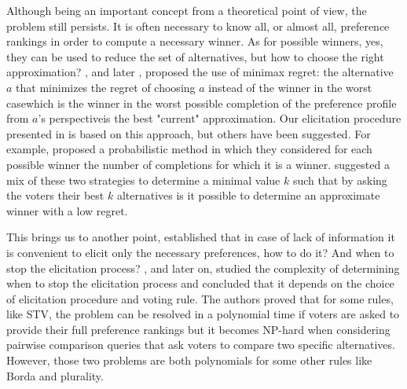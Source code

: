 Although being an important concept from a theoretical point of view, the problem still persists. It is often necessary to know all, or almost all, preference rankings in order to compute a necessary winner. As for possible winners, yes, they can be used to reduce the set of alternatives, but how to choose the right approximation?
\citet{Boutilier2006}, and later \citet{Lu2011}, proposed the use of minimax regret: the alternative $a$ that minimizes the regret of choosing $a$ instead of the winner in the worst case\textemdash which is the winner in the worst possible completion of the preference profile from $a$'s perspective\textemdash is the best "current" approximation.
Our elicitation procedure presented in  is based on this approach, but others have been suggested.
For example, \citet{Bachrach2010} proposed a probabilistic method in which they considered for each possible winner the number of completions for which it is a winner.
\citet{Lu2011Prob} suggested a mix of these two strategies to determine a minimal value $k$ such that by asking the voters their best $k$ alternatives is it possible to determine an approximate winner with a low regret.

This brings us to another point, established that in case of lack of information it is convenient to elicit only the necessary preferences, how to do it? And when to stop the elicitation process?
\citet{Conitzer2002}, and \citet{Walsh2009} later on, studied the complexity of determining when to stop the elicitation process and concluded that it depends on the choice of elicitation procedure and voting rule. The authors proved that for some rules, like \ac{STV}, the problem can be resolved in a polynomial time if voters are asked to provide their full preference rankings but it becomes NP-hard when considering pairwise comparison queries that ask voters to compare two specific alternatives. However, those two problems are both polynomials for some other rules like Borda and plurality.

